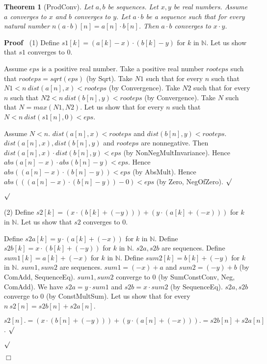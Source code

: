 \documentclass{article}
\newenvironment{forthel}{\begin{leftbar}}{\end{leftbar}}
\newenvironment{proof}{\noindent\textbf{Proof\ }}{\hspace*{\fill}$\Box$\medskip}
\newenvironment{subproof}{\begin{list}{}{}
		\item[\text{Proof}]}{\hfill $\surd$ \end{list}}
\newtheorem{theorem}{Theorem}
\newcommand{\NN}{\mathbb{N}}
\newcommand{\cdotone}{\cdot}
\newcommand{\cdottwo}{\cdot}
\newcommand{\plustwo}{+}
\begin{document}
\begin{forthel}
	\begin{theorem}[ProdConv]
	Let $a,b$ be sequences. Let $x,y$ be real numbers. Assume $a$ converges to $x$ and $b$ converges to $y$.
	Let $a \cdotone b$ be a sequence such that for every natural number $n (a \cdotone b)[n] = a[n] \cdot b[n]$.
	Then $a \cdotone b$ converges to $x \cdot y$.
	\end{theorem}
	\begin{proof}
	(1) Define $s1[k] = (a[k] - x) \cdot (b[k] - y)$ for $k$ in $\NN$.
	Let us show that $s1$ converges to $0$. 
	\begin{subproof}
    Assume $eps$ is a positive real number. 
    Take a positive real number $rooteps$ such that $rooteps = sqrt(eps)$ (by Sqrt).
    Take $N1$ such that for every $n$ such that $N1 < n \ dist(a[n],x) < rooteps$ (by Convergence).
    Take $N2$ such that for every $n$ such that $N2 < n \ dist(b[n],y) < rooteps$ (by Convergence).
    Take $N$ such that $N = max(N1,N2)$.
    Let us show that for every $n$ such that $N < n \ dist(s1[n],0) < eps$.
    \begin{subproof}
    Assume $N < n$.
    $dist(a[n],x) < rooteps$ and $dist(b[n],y) < rooteps$.
    $dist(a[n],x), dist(b[n],y)$ and $rooteps$ are nonnegative.
    Then $dist(a[n],x) \cdot dist(b[n],y) < eps$ (by NonNegMultInvariance).
    Hence $abs(a[n] - x) \cdot abs(b[n] - y) < eps$.
    Hence $abs((a[n] - x) \cdot (b[n] - y)) < eps$ (by AbsMult).
    Hence $abs(((a[n] - x) \cdot (b[n] - y)) - 0) < eps$ (by Zero, NegOfZero).
    \end{subproof}
	\end{subproof}
	(2) Define $s2[k] = (x \cdot (b[k] + (-y))) + (y \cdot (a[k] + (-x)))$ for $k$ in $\NN$.
	Let us show that $s2$ converges to $0$.
	\begin{subproof}
	Define $s2a[k] = y \cdot (a[k] + (-x))$ for $k$ in $\NN$.
	Define $s2b[k] = x \cdot (b[k] + (-y))$ for $k$ in $\NN$.
	$s2a, s2b$ are sequences.
	Define $sum1[k] = a[k] + (-x)$ for $k$ in $\NN$.
	Define $sum2[k] = b[k] + (-y)$ for $k$ in $\NN$.
	$sum1, sum2$ are sequences.
	$sum1 = (-x) \plustwo a$ and $sum2 = (-y) \plustwo b$ (by ComAdd, SequenceEq).
	$sum1, sum2$ converge to $0$ (by SumConstConv, Neg, ComAdd).
	We have $s2a = y \cdottwo sum1$ and $s2b = x \cdottwo sum2$ (by SequenceEq).
	$s2a, s2b$ converge to $0$ (by ConstMultSum). 
	Let us show that for every $n \ s2[n] = s2b[n] + s2a[n]$.
	\begin{subproof}
	$s2[n] .= (x \cdot (b[n] + (-y))) + (y \cdot (a[n] + (-x)))
	.= s2b[n] + s2a[n]$.
	\end{subproof}

\end{subproof}
\end{proof}
\end{forthel}
\end{document}
